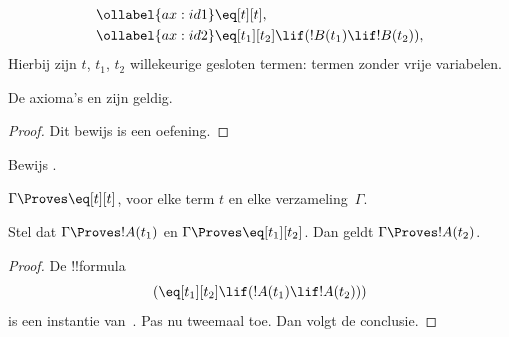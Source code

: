 \documentclass[openany]{memoir}
\begin{document}
\begin{defn}
\begin{align}
\ollabel{ax:id1} & \eq[t][t], \\
\ollabel{ax:id2} & \eq[t_1][t_2] \lif (!B(t_1) \lif
  !B(t_2)),
\end{align}
Hierbij zijn $t$, $t_1$, $t_2$ willekeurige gesloten termen: termen
zonder vrije variabelen.
\end{defn}

\begin{prop}
  De axioma's  en  zijn geldig.
\end{prop}

\begin{proof}
  Dit bewijs is een oefening.
\end{proof}

\begin{prob}
Bewijs .
\end{prob}

\begin{prop}
 $\Gamma \Proves \eq[t][t]$, voor elke term $t$ en elke
 verzameling~$\Gamma$.
\end{prop}

\begin{prop}
  Stel dat $\Gamma \Proves !A(t_1)$ en $\Gamma \Proves
  \eq[t_1][t_2]$. Dan geldt $\Gamma \Proves !A(t_2)$.
\end{prop}

\begin{proof}
De !!{formula}
\[
(\eq[t_1][t_2] \lif (!A(t_1) \lif !A(t_2)))
\]
is een instantie van~. Pas nu \MP{} tweemaal toe. Dan
volgt de conclusie.
\end{proof}
\endgroup
\OLEndChapterHook

\begingroup
\def\olfilename{OLP-0126}
\def\olfilepath{content/first-order-logic/completeness/}
\hypertarget{unit-OLP-0126}{}
\end{document}
